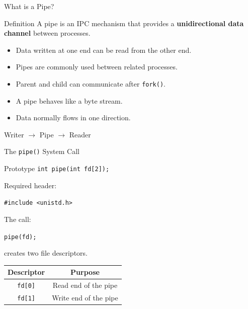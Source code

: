 \documentclass[aspectratio=169]{beamer}
\begin{document}
\begin{frame}{What is a Pipe?}

\begin{block}{Definition}
A pipe is an IPC mechanism that provides a
\textbf{unidirectional data channel} between processes.
\end{block}

\begin{itemize}
    \item Data written at one end can be read from the other end.
    \item Pipes are commonly used between related processes.
    \item Parent and child can communicate after \texttt{fork()}.
    \item A pipe behaves like a byte stream.
    \item Data normally flows in one direction.
\end{itemize}

\begin{center}
\Large
Writer $\longrightarrow$ Pipe $\longrightarrow$ Reader
\end{center}

\end{frame}

\begin{frame}{The \texttt{pipe()} System Call}

\begin{block}{Prototype}
\centering
\texttt{int pipe(int fd[2]);}
\end{block}

Required header:

\begin{center}
\texttt{\#include <unistd.h>}
\end{center}

\vspace{0.3cm}

The call:

\begin{center}
\texttt{pipe(fd);}
\end{center}

creates two file descriptors.

\begin{center}
\begin{tabular}{|c|c|}
\hline
\textbf{Descriptor} & \textbf{Purpose} \\
\hline
\texttt{fd[0]} & Read end of the pipe \\
\hline
\texttt{fd[1]} & Write end of the pipe \\
\hline
\end{tabular}
\end{center}

\end{frame}
\end{document}
